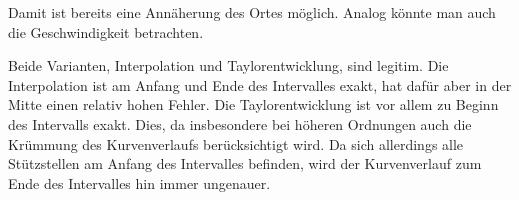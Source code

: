 Damit ist bereits eine Annäherung des Ortes möglich. Analog könnte man auch die Geschwindigkeit betrachten.

Beide Varianten, Interpolation und Taylorentwicklung, sind legitim. Die Interpolation ist am Anfang und Ende des Intervalles exakt, hat dafür aber in der Mitte einen relativ hohen Fehler. Die Taylorentwicklung ist vor allem zu Beginn des Intervalls exakt. Dies, da insbesondere bei höheren Ordnungen auch die Krümmung des Kurvenverlaufs berücksichtigt wird. Da sich allerdings alle Stützstellen am Anfang des Intervalles befinden, wird der Kurvenverlauf zum Ende des Intervalles hin immer ungenauer.
